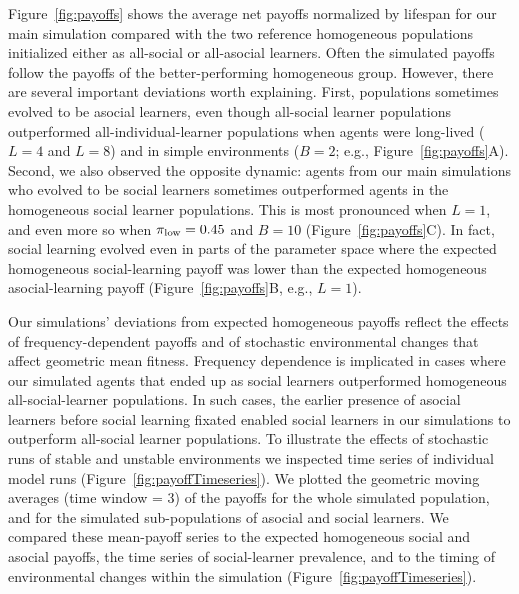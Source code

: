 \documentclass[letterpaper,11.5pt]{scrartcl}
\begin{document}
Figure~\ref{fig:payoffs} shows the average net payoffs normalized by lifespan
for our main simulation compared with the two reference homogeneous populations
initialized either as all-social or all-asocial learners. Often the simulated payoffs follow the payoffs of the better-performing homogeneous group. However, there are several important deviations worth explaining. First, populations sometimes evolved to be asocial learners, even
though all-social learner populations outperformed all-individual-learner populations when agents were
long-lived ($L=4$ and $L=8$) and in simple environments ($B=2$; e.g., Figure~\ref{fig:payoffs}A).
Second, we also observed the opposite dynamic: agents from our main simulations who evolved to be social learners sometimes outperformed agents in the homogeneous social learner populations. This is most pronounced when $L=1$, and even more
so when $\pi_{\mathrm{low}}=0.45$ and $B=10$ (Figure~\ref{fig:payoffs}C).
In fact, social learning evolved even in parts of the parameter space where the expected homogeneous social-learning payoff was lower than the expected homogeneous
asocial-learning payoff (Figure~\ref{fig:payoffs}B, e.g., $L=1$).

Our simulations' deviations from expected homogeneous payoffs reflect the effects of frequency-dependent payoffs and of stochastic environmental changes that affect geometric mean fitness. Frequency dependence is implicated in cases where our simulated agents that ended up as social learners outperformed homogeneous all-social-learner populations. In such cases, the earlier presence of asocial learners before social learning fixated enabled social learners in our simulations to outperform all-social learner populations. To illustrate the effects of stochastic runs of stable and unstable environments we inspected time series of individual model runs (Figure~\ref{fig:payoffTimeseries}). We plotted the geometric moving averages (time window = 3) of the payoffs for the whole simulated population, and for the simulated sub-populations of asocial and social learners. We compared these mean-payoff series to the expected homogeneous social and asocial payoffs, the time series of social-learner prevalence, and to the timing of environmental changes within the simulation (Figure~\ref{fig:payoffTimeseries}). 
\end{document}
